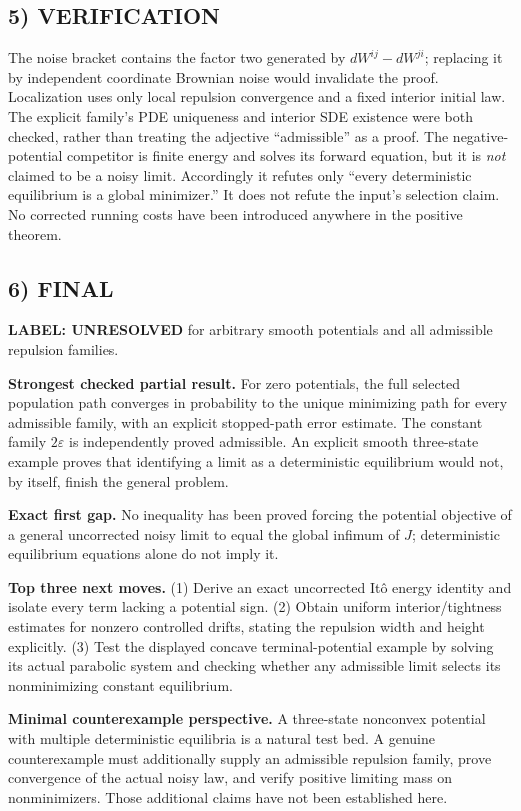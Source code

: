 \documentclass[11pt,a4paper]{article}
\theoremstyle{definition}
\theoremstyle{remark}
\begin{document}
\subsection*{5) VERIFICATION}
The noise bracket contains the factor two generated by $dW^{ij}-dW^{ji}$; replacing it by independent coordinate Brownian noise would invalidate the proof. Localization uses only local repulsion convergence and a fixed interior initial law. The explicit family's PDE uniqueness and interior SDE existence were both checked, rather than treating the adjective ``admissible'' as a proof. The negative-potential competitor is finite energy and solves its forward equation, but it is \emph{not} claimed to be a noisy limit. Accordingly it refutes only ``every deterministic equilibrium is a global minimizer.'' It does not refute the input's selection claim. No corrected running costs have been introduced anywhere in the positive theorem.

\subsection*{6) FINAL}
\textbf{LABEL: UNRESOLVED} for arbitrary smooth potentials and all admissible repulsion families.

\textbf{Strongest checked partial result.} For zero potentials, the full selected population path converges in probability to the unique minimizing path for every admissible family, with an explicit stopped-path error estimate. The constant family $2\varepsilon$ is independently proved admissible. An explicit smooth three-state example proves that identifying a limit as a deterministic equilibrium would not, by itself, finish the general problem.

\textbf{Exact first gap.} No inequality has been proved forcing the potential objective of a general uncorrected noisy limit to equal the global infimum of $J$; deterministic equilibrium equations alone do not imply it.

\textbf{Top three next moves.} (1) Derive an exact uncorrected It\^o energy identity and isolate every term lacking a potential sign. (2) Obtain uniform interior/tightness estimates for nonzero controlled drifts, stating the repulsion width and height explicitly. (3) Test the displayed concave terminal-potential example by solving its actual parabolic system and checking whether any admissible limit selects its nonminimizing constant equilibrium.

\textbf{Minimal counterexample perspective.} A three-state nonconvex potential with multiple deterministic equilibria is a natural test bed. A genuine counterexample must additionally supply an admissible repulsion family, prove convergence of the actual noisy law, and verify positive limiting mass on nonminimizers. Those additional claims have not been established here.
\end{document}

